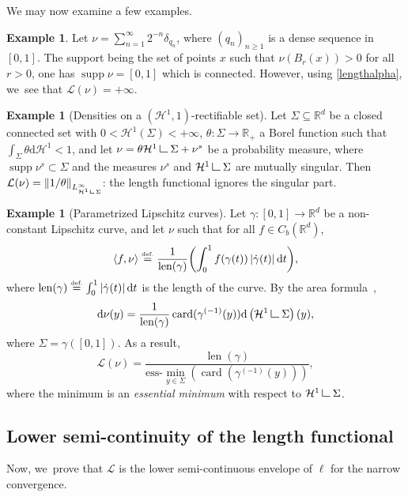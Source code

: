\documentclass[JEP,XML,SOM,Unicode,NoFloatCountersInSection,published]{cedram}
\theoremstyle{definition}
\newtheorem{example}[theorem]{Example}
\newcommand{\eqdef}{\ensuremath{\stackrel{\mbox{\upshape\tiny def.}}{=}}}
\newcommand{\norm}[1]{\left\lVert#1\right\rVert}
\newcommand\LM[1]{\hbox{\vrule width.5pt \vbox to#1pt{\vfill \hrule width#1pt height.5pt}}}
\newcommand\LL{{\mathchoice {\>\LM7\>}{\>\LM7\>}{\,\LM5\,}{\,\LM{3.35}\,}}}
\newcommand{\mres}{\LL}
\newcommand\cH{\mathcal{H}}
\newcommand{\RR}{\mathbb{R}}
\DeclareMathOperator{\supp}{supp}
\DeclareMathOperator{\len}{len}
\DeclareMathOperator{\card}{card}
\newcommand\dd{\mathrm{d}}
\newcommand{\abs}[1]{\left\lvert#1\right\rvert}
\newcommand{\ci}[2]{ \left[ #1, #2 \right] }
\begin{document}
We may now examine a few examples.
\begin{example}\label{example.diracs_dense_sequence}
Let $\nu=\sum_{n=1}^{\infty} 2^{-n}\delta_{q_n}$, where $(q_{n})_{n\ge 1}$ is a dense sequence in $\ci{0}{1}$. The support being the set of points $x$ such that $\nu(B_r(x)) > 0$ for all $r>0$, one has $\supp \nu = [0,1]$ which is connected. However, using \eqref{lengthalpha}, we~see that $\mathcal{L}(\nu)=+\infty$.
\end{example}

\begin{example}[Densities on a $(\cH^1,1)$-rectifiable set]\label{example.densities_rectifiable_set}
Let $\Sigma \subseteq \RR^d$ be a closed connected set with $0<\cH^1(\Sigma)<+\infty$, $\theta\colon \Sigma \rightarrow \RR_+$ a Borel function such that $ \int_\Sigma \theta\dd \cH^1 < 1$, and let $\nu = \theta \cH^1\mres \Sigma + \nu^s$ be a probability measure, where $\supp \nu^s \subset \Sigma$ and the measures $\nu^s$ and $\cH^1\mres\Sigma$ are mutually singular.
Then $\mathcal{L}(\nu)= \norm{1/\theta}_{L^\infty_{\cH^1\mres \Sigma}}$: the length functional ignores the singular part.
\end{example}

\begin{example}[Parametrized Lipschitz curves]\label{example.parametrized_curve}
Let $\gamma\colon \ci{0}{1}\rightarrow \RR^d$ be a non-constant Lipschitz curve, and let $\nu$ such that for all $f \in C_b(\RR^d)$,
\[
\langle f, \nu\rangle \eqdef \frac{1}{\len(\gamma)}\biggl(\int_0^1f(\gamma(t))\abs{\dot\gamma(t)}\dd t\biggr),
\]
where $\len(\gamma)\eqdef \int_0^1 \abs{\dot\gamma(t)}\dd t$ is the length of the curve.
By the area formula~\cite[Th.\,3.2.5]{federer2014geometric},
\begin{equation*}
\dd\nu(y)= \frac{1}{\len(\gamma)} \card(\gamma^{(-1)}(y))\dd\left( \cH^1\mres \Sigma\right)(y),
\end{equation*}
where $\Sigma=\gamma(\ci{0}{1})$. As a result,
\begin{equation}
\mathcal{L}(\nu) = \frac{\len(\gamma)}{\mathrm{ess}\mbox{-}\min_{y \in\Sigma}\left(\card(\gamma^{(-1)}(y))\right)},
\end{equation}
where the minimum is an \emph{essential minimum} with respect to $\cH^1\mres \Sigma$.
\end{example}

\subsection{Lower semi-continuity of the length functional}
\label{sec.length_functional_is_lsc}
Now, we~prove that $\mathcal{L}$ is the lower semi-continuous envelope of $\ell$ for the narrow convergence.
\end{document}
